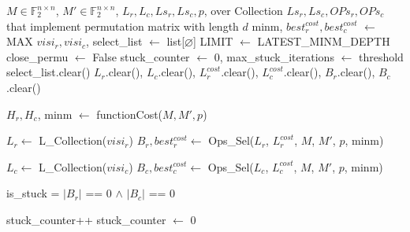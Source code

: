 \begin{algorithm}[htbp]
\caption{Parallel Greedy}
\label{alg:parallel-greedy}
\scriptsize
\begin{algorithmic}[1]
\Require $M \in \mathbb{F}_{2}^{n \times n}$, $M' \in \mathbb{F}_{2}^{n \times n}$, $L_{r}, L_{c}, Ls_{r}, Ls_{c}, p$, over
\Ensure Collection $Ls_{r}, Ls_{c}, OPs_{r}, OPs_{c}$ that implement permutation matrix with length $d$
\State minm, $best_{r}^{cost}, best_{c}^{cost}$ $\leftarrow$ MAX 
\State $visi_{r}, visi_{c}$, select\_list $\leftarrow$ list[$\varnothing$] 
\State LIMIT $\leftarrow$ LATEST\_MINM\_DEPTH 
\State close\_permu $\leftarrow$ False
\State stuck\_counter $\leftarrow$ 0, max\_stuck\_iterations $\leftarrow$ threshold 
	\State select\_list.clear()
	\State $L_{r}$.clear(), $L_{c}$.clear(), $L_{r}^{cost}$.clear(), $L_{c}^{cost}$.clear(), $B_{r}$.clear(), $B_{c}$.clear() 
	
	\State $H_{r}, H_{c}$, minm $\leftarrow$ functionCost($M, M', p$) 
    
		\State $L_{r} \leftarrow$ L\_Collection($visi_{r}$) 
		\State $B_{r}, best_{r}^{cost} \leftarrow$ Ops\_Sel($L_{r}$, $L_{r}^{cost}$, $M$, $M'$, $p$, minm)  
    \EndIf
    
	\State $L_{c} \leftarrow$ L\_Collection($visi_{c}$) 
	\State $B_{c}, best_{c}^{cost} \leftarrow$ Ops\_Sel($L_{c}$, $L_{c}^{cost}$, $M$, $M'$, $p$, minm) 
	
	\State is\_stuck = $|B_{r}|$ == 0 $\land$ $|B_{c}|$ == 0
	
		\State stuck\_counter++ 
	\Else
		\State stuck\_counter $\leftarrow$ 0 
    \EndIf
    

\end{algorithmic}
\end{algorithm}
